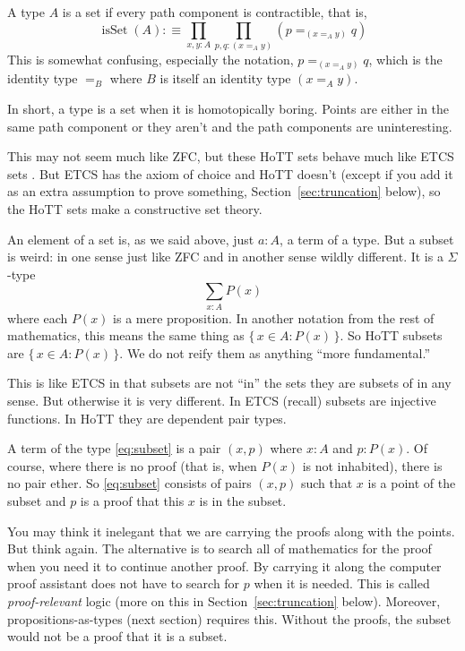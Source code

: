 \documentclass[11pt]{article}
\DeclareMathOperator{\isSet}{isSet}
\newcommand{\set}[1]{\{\,#1\,\}}
\begin{document}
A type $A$ is a set  if every path component
is contractible, that is,
\begin{equation} \label{eq:set}
   \isSet(A) :\equiv \prod_{x, y : A} \prod_{p, q : (x =_A y)}
   (p =_{(x =_A y)} q)
\end{equation}
This is somewhat confusing, especially the notation, $p =_{(x =_A y)} q$,
which is the identity type $=_B$ where $B$ is itself an identity type
$(x =_A y)$.

In short, a type is a set when it is homotopically boring.  Points
are either in the same path component or they aren't and the path
components are uninteresting.

This may not seem much like ZFC, but
these HoTT sets behave much like ETCS sets .
But ETCS has the axiom of choice
and HoTT doesn't (except if you add it as an extra assumption to prove
something, Section~\ref{sec:truncation} below),
so the HoTT sets make a constructive set theory.

An element of a set is, as we said above, just $a : A$, a term of a type.
But a subset is weird: in one sense just like ZFC and in
another sense wildly different.  It is a $\Sigma$-type
\begin{equation} \label{eq:subset}
   \sum_{x : A} P(x)
\end{equation}
where each $P(x)$ is a mere proposition.  In another notation from the rest
of mathematics, this means the same thing as $\set{x \in A: P(x)}$.
So HoTT subsets are $\set{x \in A: P(x)}$.  We do not reify them as
anything ``more fundamental.''

This is like ETCS in that subsets are not ``in'' the sets they are subsets
of in any sense.  But otherwise it is very different.  In ETCS (recall)
subsets are injective functions.  In HoTT they are dependent pair types.

A term of the type \eqref{eq:subset} is a pair $(x, p)$
where $x : A$ and $p : P(x)$.  Of course, where there is no proof (that is,
when $P(x)$ is not inhabited), there is no pair ether.
So \eqref{eq:subset} consists of pairs $(x, p)$ such that $x$ is a point
of the subset and $p$ is a proof that this $x$ is in the subset.

You may think it inelegant that we are carrying the proofs along with
the points.  But think again.  The alternative is to search all of mathematics
for the proof when you need it to continue another proof.  By carrying it
along the computer proof assistant does not have to search for $p$ when it
is needed.  This is called \emph{proof-relevant} logic
(more on this in Section~\ref{sec:truncation} below).
Moreover, propositions-as-types (next section) requires this.
Without the proofs, the subset would not be a proof that it is a subset.
\end{document}
